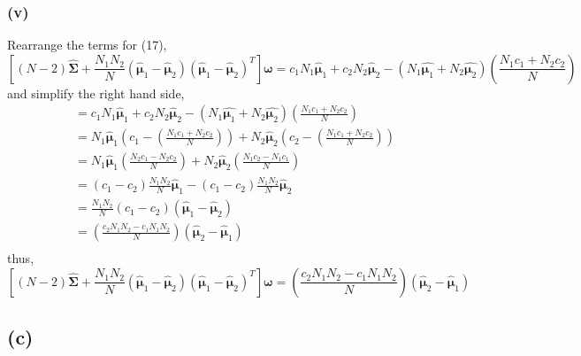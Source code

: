 \documentclass[11pt]{article}
\begin{document}
\subsubsection*{(v)}
Rearrange the terms for (17),
$$\left[(N-2)\hat{\pmb{\Sigma}} +\frac{N_1N_2}{N}\left(\hat{\pmb{\mu}}_1-\hat{\pmb{\mu}}_2\right)\left(\hat{\pmb{\mu}}_1-\hat{\pmb{\mu}}_2\right)^T\right]\pmb{\omega}=c_1N_1\hat{\pmb{\mu}}_1+c_2N_2\hat{\pmb{\mu}}_2-\left(N_1\hat{\pmb{\mu}_1}+N_2\hat{\pmb{\mu}_2}\right)\left(\frac{N_1c_1+N_2c_2}{N}\right)$$
and simplify the right hand side,
\begin{equation}
\begin{split}
&=c_1N_1\hat{\pmb{\mu}}_1+c_2N_2\hat{\pmb{\mu}}_2-\left(N_1\hat{\pmb{\mu}_1}+N_2\hat{\pmb{\mu}_2}\right)\left(\frac{N_1c_1+N_2c_2}{N}\right)\\
&=N_1\hat{\pmb{\mu}}_1\left(c_1-\left(\frac{N_1c_1+N_2c_2}{N}\right)\right)+
N_2\hat{\pmb{\mu}}_2\left(c_2-\left(\frac{N_1c_1+N_2c_2}{N}\right)\right)\\
&=N_1\hat{\pmb{\mu}}_1\left(\frac{N_2c_1-N_2c_2}{N}\right)+
N_2\hat{\pmb{\mu}}_2\left(\frac{N_1c_2-N_1c_1}{N}\right)\\
&=\left(c_1-c_2\right)\frac{N_1N_2}{N}\hat{\pmb{\mu}}_1-
\left(c_1-c_2\right)\frac{N_1N_2}{N}\hat{\pmb{\mu}}_2\\
&=\frac{N_1N_2}{N}\left(c_1-c_2\right)\left(\hat{\pmb{\mu}}_1-\hat{\pmb{\mu}}_2\right)\\
&=\left(\frac{c_2N_1N_2-c_1N_1N_2}{N}\right)\left(\hat{\pmb{\mu}}_2-\hat{\pmb{\mu}}_1\right)\\
\end{split}
\end{equation}
thus,
$$\left[(N-2)\hat{\pmb{\Sigma}} +\frac{N_1N_2}{N}\left(\hat{\pmb{\mu}}_1-\hat{\pmb{\mu}}_2\right)\left(\hat{\pmb{\mu}}_1-\hat{\pmb{\mu}}_2\right)^T\right]\pmb{\omega}=\left(\frac{c_2N_1N_2-c_1N_1N_2}{N}\right)\left(\hat{\pmb{\mu}}_2-\hat{\pmb{\mu}}_1\right)$$
\subsection*{(c)}
\end{document}
